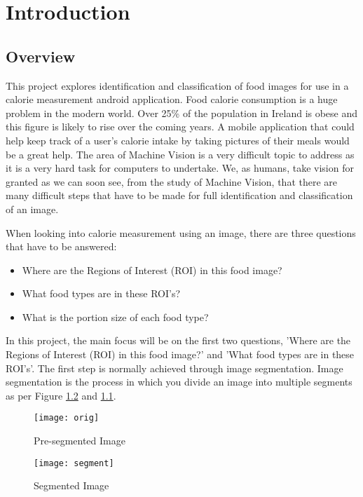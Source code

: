 \chapter{Introduction}
\label{intro}

\section{Overview}
This project explores identification and classification of food images for use in a calorie measurement android application.
Food calorie consumption is a huge problem in the modern world.
Over 25\% of the population in Ireland is obese and this figure is likely to rise over the coming years.
A mobile application that could help keep track of a user's calorie intake by taking pictures of their meals would be a great help.
The area of Machine Vision is a very difficult topic to address as it is a very hard task for computers to undertake.
We, as humans, take vision for granted as we can soon see, from the study of Machine Vision, that there are many difficult steps that have to be made for full identification and classification of an image.

When looking into calorie measurement using an image, there are three questions that have to be answered:
\begin{itemize}
	\item{Where are the Regions of Interest (ROI) in this food image?}
	\item{What food types are in these ROI's?}
	\item{What is the portion size of each food type?}
\end{itemize}

In this project, the main focus will be on the first two questions, 'Where are the
Regions of Interest (ROI) in this food image?' and 'What food types are in these ROI's'. The first step is normally achieved through image segmentation. Image segmentation is the process in which you divide an image into multiple segments as per Figure \ref{fig:imageSeg} and \ref{fig:preImageSeg}.

\begin{figure}
	\texttt{[image: orig]}
	\caption{Pre-segmented Image}
	\label{fig:preImageSeg}
\end{figure}

\begin{figure}
	\texttt{[image: segment]}
	\caption{Segmented Image}
	\label{fig:imageSeg}
\end{figure}


